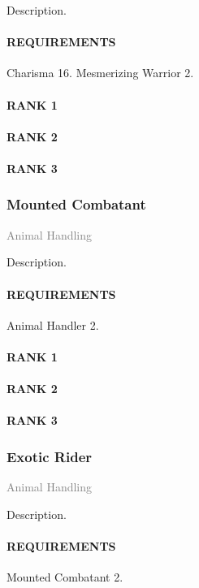 \normalsize
Description.
\paragraph{REQUIREMENTS} Charisma 16. Mesmerizing Warrior 2.
\paragraph{RANK 1}
\paragraph{RANK 2}
\paragraph{RANK 3} %

\subsubsection{Mounted Combatant} \label{feat::mountedcombatant} %
\small{\textcolor{gray}{Animal Handling}}

\normalsize
Description.
\paragraph{REQUIREMENTS} Animal Handler 2.
\paragraph{RANK 1}
\paragraph{RANK 2}
\paragraph{RANK 3}

\subsubsection{Exotic Rider} \label{feat::exoticrider} %
\small{\textcolor{gray}{Animal Handling}}

\normalsize
Description.
\paragraph{REQUIREMENTS} Mounted Combatant 2.
